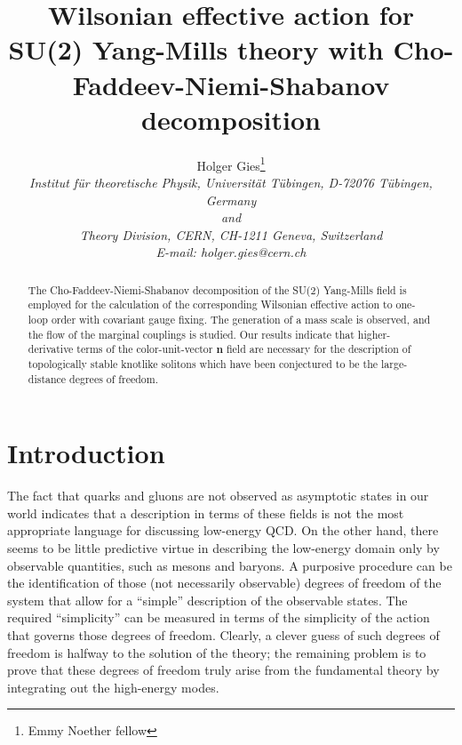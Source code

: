 \documentclass[a4paper,12pt]{article}
\begin{document}
\newcommand{\meff}{m_{\text{eff}}}
\newcommand{\Geff}{\Gamma_{\text{eff}}}
\newcommand{\Leff}{{\cal L}_{\text{eff}}}
\newcommand{\mn}{\mathbf{n}}
\newcommand{\mW}{\mathbf{W}}
\newcommand{\mA}{\mathbf{A}}
\newcommand{\mQ}{\mathbf{Q}}
\newcommand{\mK}{\mathbf{K}^{\!\mW}}
\newcommand{\mX}{\boldsymbol{\chi}}
\newcommand{\mF}{\boldsymbol{\phi}}
\newcommand{\case}[2]{{\scriptstyle \frac{#1}{#2}}}
\unitlength=1mm
\title{\bf Wilsonian effective action for SU(2) Yang-Mills theory with
  Cho-Faddeev-Niemi-Shabanov decomposition} 
\author{Holger Gies\thanks{Emmy Noether fellow}\\
  \small\it Institut f\"ur theoretische Physik, Universit\"at T\"ubingen,
  D-72076 T\"ubingen, Germany\\
  \small\it and\\
  \small\it Theory Division, CERN, CH-1211 Geneva, Switzerland\\
  \small\it E-mail: holger.gies@cern.ch }
\maketitle
\begin{abstract}
  The Cho-Faddeev-Niemi-Shabanov decomposition of the SU(2) Yang-Mills
  field is employed for the calculation of the corresponding Wilsonian
  effective action to one-loop order with covariant gauge fixing. The
  generation of a mass scale is observed, and the flow of the marginal
  couplings is studied. Our results indicate that higher-derivative
  terms of the color-unit-vector $\mathbf{n}$ field are necessary for
  the description of topologically stable knotlike solitons which
  have been conjectured to be the large-distance degrees of freedom.
\end{abstract}

\section{Introduction}
The fact that quarks and gluons are not observed as asymptotic states
in our world indicates that a description in terms of these fields
is not the most appropriate language for discussing
low-energy QCD. On the other hand, there seems to be little predictive
virtue in describing the low-energy domain only by observable
quantities, such as mesons and baryons. A purposive procedure can be
the identification of those (not necessarily observable) degrees of
freedom of the system that allow for a ``simple'' description of the
observable states. The required ``simplicity'' can be measured in
terms of the simplicity of the action that governs those degrees of
freedom. Clearly, a clever guess of such degrees of freedom is halfway
to the solution of the theory; the remaining problem is to prove that
these degrees of freedom truly arise from the fundamental theory by
integrating out the high-energy modes.
\end{document}
